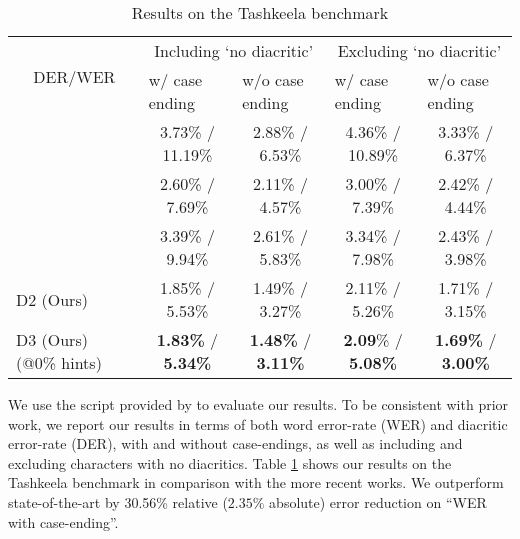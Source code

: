 \documentclass[11pt]{article}
\begin{document}
\begin{table}[h]
\begin{tabular}{|l|c|c|c|c|}
\hline
\multicolumn{1}{|c|}{\multirow{2}{*}{DER/WER}} & \multicolumn{2}{c|}{Including `no diacritic'} & \multicolumn{2}{c|}{Excluding `no diacritic'} \\ \cline{2-5} 
\multicolumn{1}{|c|}{} & \multicolumn{1}{l|}{w/ case ending} & \multicolumn{1}{l|}{w/o case ending} & \multicolumn{1}{l|}{w/ case ending} & \multicolumn{1}{l|}{w/o case ending} \\ \hline
\cite{shakkala}         & 3.73\% / 11.19\%          & 2.88\% / 6.53\%         & 4.36\% / 10.89\%           & 3.33\% / 6.37\%            \\ \hline
\cite{fadel19-neural}   & 2.60\% / 7.69\%           & 2.11\% / 4.57\%         & 3.00\% / 7.39\%            & 2.42\% / 4.44\%            \\ \hline
\cite{hamza20}          & 3.39\% / 9.94\%           & 2.61\% / 5.83\%         & 3.34\% / 7.98\%            & 2.43\% / 3.98\%            \\ \hline
D2 (Ours)               & 1.85\% / 5.53\%           & 1.49\% / 3.27\%         & 2.11\% / 5.26\%            & 1.71\% / 3.15\%            \\ \hline
D3 (Ours) (@0\% hints)  & \textbf{1.83\%} / \textbf{5.34\%}  & \textbf{1.48\%} / \textbf{3.11\%}  & \textbf{2.09}\%  / \textbf{5.08\%}     & \textbf{1.69\%} / \textbf{3.00\%}   \\ \hline
\end{tabular}
\caption{Results on the Tashkeela benchmark}
\label{tashkeela-results}
\end{table}

We use the script provided by \cite{fadel19} to evaluate our results. To be consistent with prior work, we report our results in terms of both word error-rate (WER) and diacritic error-rate (DER), with and without case-endings, as well as including and excluding characters with no diacritics. Table \ref{tashkeela-results} shows our results on the Tashkeela benchmark in comparison with the more recent works. We outperform state-of-the-art by 30.56\% relative ($2.35\%$ absolute) error reduction on ``WER with case-ending''.
\end{document}
